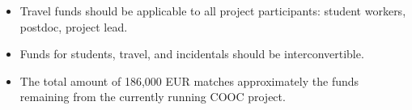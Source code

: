 \documentclass[a4paper,11pt]{article}
\begin{document}
\begin{itemize}
\item
  Travel funds should be applicable to all project participants:
  student workers, postdoc, project lead.
\item 
  Funds for students, travel, and incidentals should be
  interconvertible.
\item 
  The total amount of 186,000 EUR matches approximately the funds
  remaining from the currently running COOC project.
\end{itemize}


\end{document}
